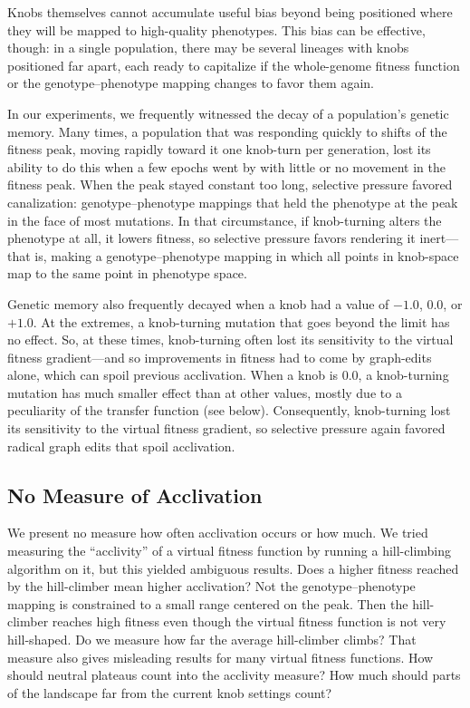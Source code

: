 \documentclass[letterpaper]{article}
\begin{document}
Knobs themselves cannot accumulate useful bias beyond being positioned where
they will be mapped to high-quality phenotypes. This bias can be effective,
though: in a single population, there may be several lineages with knobs
positioned far apart, each ready to capitalize if the whole-genome fitness
function or the genotype--phenotype mapping changes to favor them again.

In our experiments, we frequently witnessed the decay of a population's genetic
memory. Many times, a population that was responding quickly to shifts of the
fitness peak, moving rapidly toward it one knob-turn per generation, lost its
ability to do this when a few epochs went by with little or no movement in the
fitness peak. When the peak stayed constant too long, selective pressure
favored canalization: genotype--phenotype mappings that held the phenotype at
the peak in the face of most mutations. In that circumstance, if knob-turning
alters the phenotype at all, it lowers fitness, so selective pressure favors
rendering it inert---that is, making a genotype--phenotype mapping in which all
points in knob-space map to the same point in phenotype space.

Genetic memory also frequently decayed when a knob had a value of $-1.0$,
$0.0$, or $+1.0$. At the extremes, a knob-turning mutation that goes beyond the
limit has no effect. So, at these times, knob-turning often lost its
sensitivity to the virtual fitness gradient---and so improvements in fitness
had to come by graph-edits alone, which can spoil previous acclivation. When a
knob is 0.0, a knob-turning mutation has much smaller effect than at other
values, mostly due to a peculiarity of the transfer function (see below).
Consequently, knob-turning lost its sensitivity to the virtual fitness
gradient, so selective pressure again favored radical graph edits that spoil
acclivation.

\subsection{No Measure of Acclivation}

We present no measure how often acclivation occurs or how much. We tried
measuring the ``acclivity'' of a virtual fitness function by running a
hill-climbing algorithm on it, but this yielded ambiguous results. Does a
higher fitness reached by the hill-climber mean higher acclivation? Not the
genotype--phenotype mapping is constrained to a small range centered on the
peak. Then the hill-climber reaches high fitness even though the virtual
fitness function is not very hill-shaped. Do we measure how far the average
hill-climber climbs?  That measure also gives misleading results for many
virtual fitness functions. How should neutral plateaus count into the acclivity
measure? How much should parts of the landscape far from the current knob
settings count?
\end{document}
